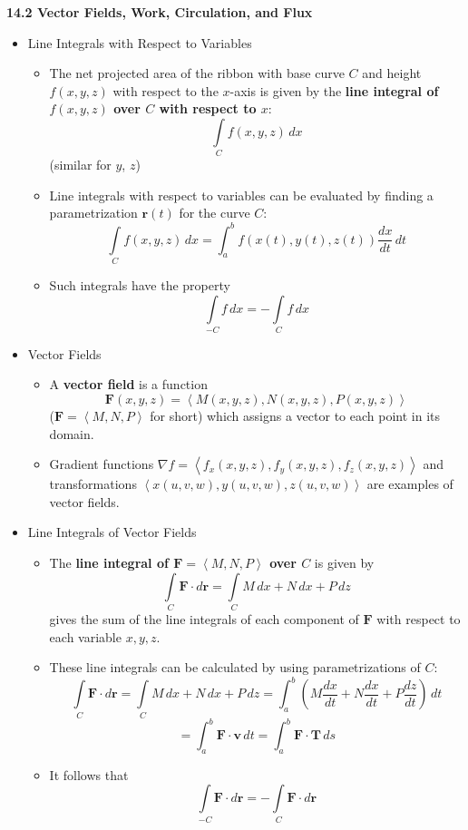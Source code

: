 \documentclass[12pt]{article}
\renewcommand{\vec}[1]{\mathbf{#1}}
\newcommand{\dvar}[1]{\,d{#1}}
\newcommand{\<}{\left<}
\renewcommand{\>}{\right>}
\begin{document}
  \newpage
  
  \centerline{\bf 14.2 Vector Fields, Work, Circulation, and Flux}
  
  \begin{itemize}
  
  \item Line Integrals with Respect to Variables
  
    \begin{itemize}
      \item The net projected area of the ribbon with base curve $C$ and height $f(x,y,z)$ with respect to the $x$-axis is given by the \textbf{line integral of $f(x,y,z)$ over $C$ with respect to $x$}: \[\int\limits_C f(x,y,z)\,dx\] (similar for $y$, $z$)
      \item Line integrals with respect to variables can be evaluated by finding a parametrization $\vec{r}(t)$ for the curve $C$:
        \[
          \int\limits_C f(x,y,z)\,dx = \int_a^b f(x(t),y(t),z(t))\frac{dx}{dt}\,dt
        \]
      \item Such integrals have the property \[\int\limits_{-C} f\dvar{x} = -\int\limits_{C} f\dvar{x}\]
    \end{itemize}
  
  \item Vector Fields
  
    \begin{itemize}
    \item A \textbf{vector field} is a function \[\vec{F}(x,y,z)=\<M(x,y,z),N(x,y,z),P(x,y,z)\>\] ($\vec{F}=\<M,N,P\>$ for short) which assigns a vector to each point in its domain.
    \item Gradient functions $\nabla f=\<f_x(x,y,z),f_y(x,y,z),f_z(x,y,z)\>$ and transformations $\<x(u,v,w),y(u,v,w),z(u,v,w)\>$ are examples of vector fields.
    \end{itemize}
  
  \item Line Integrals of Vector Fields
  
    \begin{itemize}
    \item The \textbf{line integral of $\vec{F}=\<M,N,P\>$ over $C$} is given by 
      \[\int\limits_C \vec{F}\cdot d\vec{r} = \int\limits_C M\,dx + N\,dx + P\,dz\]
    gives the sum of the line integrals of each component of $\vec{F}$ with respect to each variable $x,y,z$.
    \item These line integrals can be calculated by using parametrizations of $C$: 
      \[
        \int\limits_C \vec{F}\cdot d\vec{r} = 
        \int\limits_C M\,dx + N\,dx + P\,dz = 
        \int_a^b \left(M\frac{dx}{dt} + N\frac{dx}{dt} + P\frac{dz}{dt}\right)\,dt 
      \]
      \[
        =
        \int_a^b \vec{F}\cdot\vec{v}\,dt =
        \int_a^b \vec{F}\cdot\vec{T}\,ds 
      \]
    \item It follows that \[\int\limits_{-C} \vec{F}\cdot d\vec{r} = - \int\limits_C \vec{F}\cdot d\vec{r}\]
    \end{itemize}
    

\end{itemize}
\end{document}
